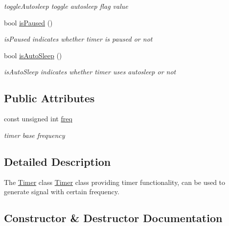 \begin{DoxyCompactItemize}
\begin{DoxyCompactList}\small\item\em toggle\+Autosleep toggle autosleep flag value \end{DoxyCompactList}\item 
bool \hyperlink{classTimer_adba0628ba7c2f61e72da83d9d8648773}{is\+Paused} ()
\begin{DoxyCompactList}\small\item\em is\+Paused indicates whether timer is paused or not \end{DoxyCompactList}\item 
bool \hyperlink{classTimer_ac3b274af3a742a97ffd1fdc5fce4c452}{is\+Auto\+Sleep} ()
\begin{DoxyCompactList}\small\item\em is\+Auto\+Sleep indicates whether timer uses autosleep or not \end{DoxyCompactList}\end{DoxyCompactItemize}
\subsection*{Public Attributes}
\begin{DoxyCompactItemize}
\item 
\hypertarget{classTimer_af676580c849532abe14b6887e93b17d0}{}const unsigned int \hyperlink{classTimer_af676580c849532abe14b6887e93b17d0}{freq}\label{classTimer_af676580c849532abe14b6887e93b17d0}

\begin{DoxyCompactList}\small\item\em timer base frequency \end{DoxyCompactList}\end{DoxyCompactItemize}


\subsection{Detailed Description}
The \hyperlink{classTimer}{Timer} class \hyperlink{classTimer}{Timer} class providing timer functionality, can be used to generate signal with certain frequency. 

\subsection{Constructor \& Destructor Documentation}
\hypertarget{classTimer_a16e1294d6277a44056a2ebe3fa968777}{}
